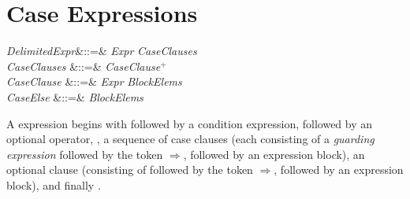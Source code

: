 %
%
%
%

\section{Case Expressions}

\begin{Grammar}
\emph{DelimitedExpr}&::=&
 \emph{Expr}   \emph{CaseClauses}
  \\

\emph{CaseClauses} &::=& \emph{CaseClause}$^+$\\

\emph{CaseClause} &::=& \emph{Expr} \EXP{\Rightarrow} \emph{BlockElems}\\

\emph{CaseElse} &::=&  \EXP{\Rightarrow} \emph{BlockElems}\\

\end{Grammar}

A  expression begins with 
followed by a condition expression, followed by an optional operator,
, a sequence of case clauses (each consisting
of a \emph{guarding expression} followed by the token $\Rightarrow$,
followed by an expression block), an optional
 clause (consisting of
 followed by the token $\Rightarrow$,
 followed by an expression block), and finally .

